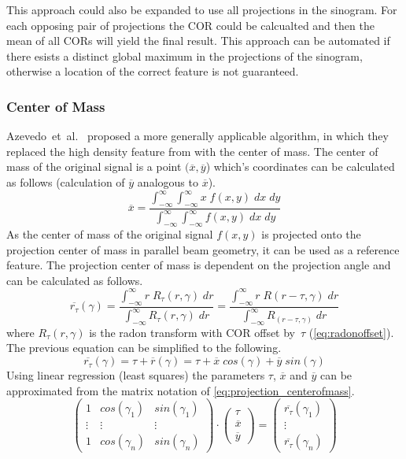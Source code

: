 \documentclass[10pt,journal,compsoc]{IEEEtran}
\begin{document}
This approach could also be expanded to use all projections in the sinogram.
For each opposing pair of projections the COR could be calcualted and then the mean of all CORs will yield the final result.
This approach can be automated if there esists a distinct global maximum in the projections of the sinogram, otherwise a location of the correct feature is not guaranteed.


\subsubsection{Center of Mass}
Azevedo~et~al.~\cite{azevedo90} proposed a more generally applicable algorithm, in which they replaced the high density feature from \cite{crawford1988} with the center of mass.
The center of mass of the original signal is a point $(\overline{x},\overline{y}$) which's coordinates can be calculated as follows (calculation of $\overline{y}$ analogous to $\overline{x}$).
%
\begin{equation}
\overline{x} = \frac{
\int_{-\infty}^{\infty}\int_{-\infty}^{\infty}x\;f(x,y)\;dx\;dy
}
{
\int_{-\infty}^{\infty}\int_{-\infty}^{\infty}f(x,y)\;dx\;dy
}
\end{equation}
%
As the center of mass of the original signal $f(x,y)$ is projected onto the projection center of mass in parallel beam geometry, it can be used as a reference feature.
The projection center of mass is dependent on the projection angle and can be calculated as follows.
%
\begin{equation}
\overline{r_\tau}(\gamma) = \frac{
\int_{-\infty}^{\infty}r\;R_\tau(r,\gamma)\;dr
}
{
\int_{-\infty}^{\infty}R_\tau(r,\gamma)\;dr
}
=
\frac{
\int_{-\infty}^{\infty}r\;R(r-\tau,\gamma)\;dr
}
{
\int_{-\infty}^{\infty}R_(r-\tau,\gamma)\;dr
}
\end{equation}
%
where $R_\tau(r,\gamma)$ is the radon transform with COR offset by~$\tau$ (\cref{eq:radonoffset}).
The previous equation can be simplified to the following.
%
\begin{equation}
\label{eq:projection_centerofmass}
\overline{r_\tau}(\gamma) = \tau + \overline{r}(\gamma) = \tau + \overline{x}\;cos(\gamma) + \overline{y}\;sin(\gamma)
\end{equation}
%
Using linear regression (least squares) the parameters $\tau$, $\overline{x}$ and $\overline{y}$ can be approximated from the matrix notation of \cref{eq:projection_centerofmass}.
%
\begin{equation}
\begin{pmatrix}
1 & cos(\gamma_1) & sin(\gamma_1) \\
\vdots & \vdots & \vdots \\
1 & cos(\gamma_n) & sin(\gamma_n) 
\end{pmatrix}
\cdot
\begin{pmatrix}
\tau \\
\overline{x} \\
\overline{y}
\end{pmatrix}
=
\begin{pmatrix}
\overline{r_\tau}(\gamma_1) \\
\vdots \\
\overline{r_\tau}(\gamma_n)
\end{pmatrix}
\end{equation}
\end{document}
